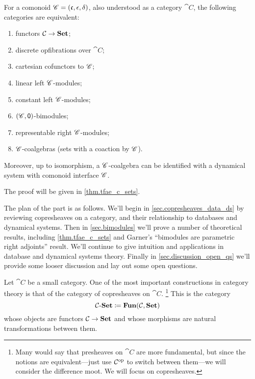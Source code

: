 \documentclass[Book-Poly]{subfiles}
\begin{document}
\begin{theorem}\label{thm.tfae_c_sets}
For a comonoid $\mathscr{C}=(\mathfrak{c},\epsilon,\delta)$, also understood as a category $\cat{C}$, the following categories are equivalent:
\begin{enumerate}
	\item functors $\mathcal{C}\to\mathbf{Set}$;
	\item discrete opfibrations over $\cat{C}$;
	\item cartesian cofunctors to $\mathscr{C}$;
	\item linear left $\mathscr{C}$-modules;
	\item constant left $\mathscr{C}$-modules;
	\item $(\mathscr{C},\textsf{0})$-bimodules;
	\item representable right $\mathscr{C}$-modules;
	\item $\mathscr{C}$-coalgebras (sets with a coaction by $\mathscr{C}$).
\end{enumerate}
Moreover, up to isomorphism, a $\mathscr{C}$-coalgebra can be identified with a dynamical system with comonoid interface $\mathscr{C}$.
\end{theorem}
The proof will be given in \cref{thm.tfae_c_sets}.

The plan of the part is as follows. We'll begin in \cref{sec.copresheaves_data_ds} by reviewing copresheaves on a category, and their relationship to databases and dynamical systems. Then in \cref{sec.bimodules} we'll prove a number of theoretical results, including \cref{thm.tfae_c_sets} and Garner's ``bimodules are parametric right adjoints'' result. We'll continue to give intuition and applications in database and dynamical systems theory. Finally in \cref{sec.discussion_open_qs} we'll provide some looser discussion and lay out some open questions.


Let $\cat{C}$ be a small category. One of the most important constructions in category theory is that of the category of copresheaves on $\cat{C}$.%
\footnote{Many would say that presheaves on $\cat{C}$ are more fundamental, but since the notions are equivalent---just use $\mathcal{C}^{\textnormal{op}}$ to switch between them---we will consider the difference moot. We will focus on copresheaves.}
This is the category
\[
\mathcal{C}\textnormal{-}\mathbf{Set}\coloneqq\mathbf{Fun}(\mathcal{C},\mathbf{Set})
\]
whose objects are functors $\mathcal{C}\to\mathbf{Set}$ and whose morphisms are natural transformations between them.
\end{document}
